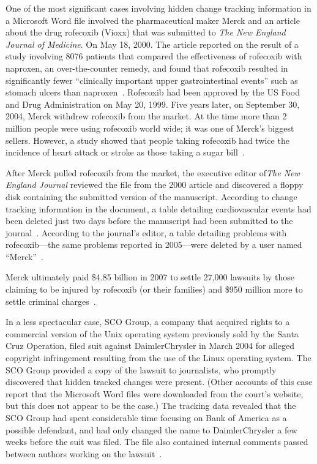 One of the most significant cases involving hidden change tracking
information in a Microsoft Word file involved the pharmaceutical maker Merck and
an article about the drug rofecoxib (Vioxx) that was submitted to
\emph{The New England Journal of Medicine}. On May 18, 2000. The
article reported on the result of a study involving 8076 patients that
compared the effectiveness of rofecoxib with naproxen, an
over-the-counter remedy, and found that rofecoxib resulted in
significantly fewer ``clinically important upper gastrointestinal
events'' such as stomach ulcers than
naproxen~\cite{bombardier-2000}. Rofecoxib had been approved by the US
Food and Drug Administration on May 20, 1999. Five years later, on
September 30, 2004, Merck withdrew rofecoxib from the market. At the
time more than 2 million people were using rofecoxib world wide; it was
one of Merck's biggest sellers. However, a study showed that people
taking rofecoxib had twice the incidence of heart attack or stroke as
those taking a sugar bill~\cite{npr-vioxx}.

After Merck pulled rofecoxib from the market, the executive editor
of\emph{The New England Journal} reviewed the file from the 2000
article and discovered a floppy disk containing the submitted version
of the manuscript. According to change tracking information in the
document, a table detailing cardiovascular events had been deleted
just two days before the manuscript had been submitted to the
journal~\cite{nejm-concern}. According to the journal's editor, a
table detailing problems with rofecoxib---the same problems reported
in 2005---were deleted by a user named
``Merck''~\cite{forbes-mercks-deleted-data}.

Merck ultimately paid \$4.85 billion in 2007 to settle 27,000 lawsuits
by those claiming to be injured by rofecoxib (or their families) and
 \$950 million more to settle criminal charges~\cite{nyt-vioxx-settlement}. 

In a less spectacular case, SCO Group, a company that acquired rights
to a commercial version of the Unix
operating system previously sold by the Santa Cruz Operation, filed
suit against DaimlerChrysler in March 2004 for alleged copyright infringement
resulting from the use of the Linux operating system. The SCO Group provided a copy of the lawsuit to
journalists, who
promptly discovered that hidden tracked changes were present. (Other accounts of this case
  report that the Microsoft Word files were downloaded from the
  court's website, but this does not appear to be the case.) The
tracking data revealed that the SCO Group had spent considerable time focusing on Bank of America as a
possible defendant, and had only changed the name to DaimlerChrysler a
few weeks before the suit was filed. The file also contained internal
comments passed between authors working on the
lawsuit~\cite{sco-hidden-text}.



